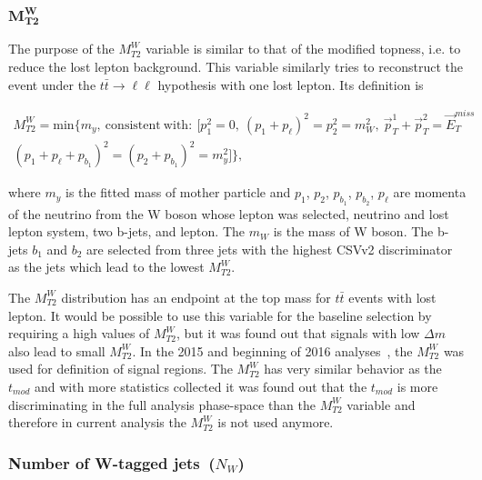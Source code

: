 \subsubsection{$\mathbf{M_{T2}^{W}}$~\label{sec:mt2w}}

The purpose of the $M_{T2}^{W}$ variable is similar to that of the modified topness, i.e. to reduce the lost lepton background. This variable similarly tries to reconstruct the event under the $t \bar{t} \to \ell \ell$ hypothesis with one lost lepton. Its definition is

\begin{equation}
\begin{split}
M_{T2}^{W} = \mathrm{min}\{m_{y},~\mathrm{consistent~with:}~[p_{1}^{2}=0,~(p_{1}+p_{\ell})^{2} = p_{2}^{2} =m_{W}^{2},~ \vec{p}_{T}^{1}+\vec{p}_{T}^{2}= \vec{E}_{T}^{miss} \\
(p_{1} + p_{\ell} + p_{b_{1}})^{2} =  (p_{2} + p_{b_{1}})^{2} = m_{y}^{2}]\},
\end{split}
\end{equation}

where $m_{y}$ is the fitted mass of mother particle and $p_{1}$, $p_{2}$, $p_{b_{1}}$, $p_{b_{2}}$, $p_{\ell}$ are momenta of the neutrino from the W boson whose lepton was selected, neutrino and lost lepton system, two b-jets, and lepton. The $m_{W}$ is the mass of W boson. The b-jets $b_{1}$ and $b_{2}$ are selected from three jets with the highest CSVv2 discriminator as the jets which lead to the lowest $M_{T2}^{W}$.

The $M_{T2}^{W}$ distribution has an endpoint at the top mass for $t\bar{t}$ events with lost lepton. It would be possible to use this variable for the baseline selection by requiring a high values of $M_{T2}^{W}$, but it was found out that signals with low $\Delta m$ also lead to small $M_{T2}^{W}$. In the 2015 and beginning of 2016 analyses~\cite{Sirunyan:2016jpr, CMS:2016vew}, the $M_{T2}^{W}$ was used for definition of signal regions. The $M_{T2}^{W}$ has very similar behavior as the $t_{mod}$ and with more statistics collected it was found out that the $t_{mod}$ is more discriminating in the full analysis phase-space than the $M_{T2}^{W}$ variable and therefore in current analysis the $M_{T2}^{W}$ is not used anymore.


\subsubsection{Number of W-tagged jets~($N_{W}$)}

